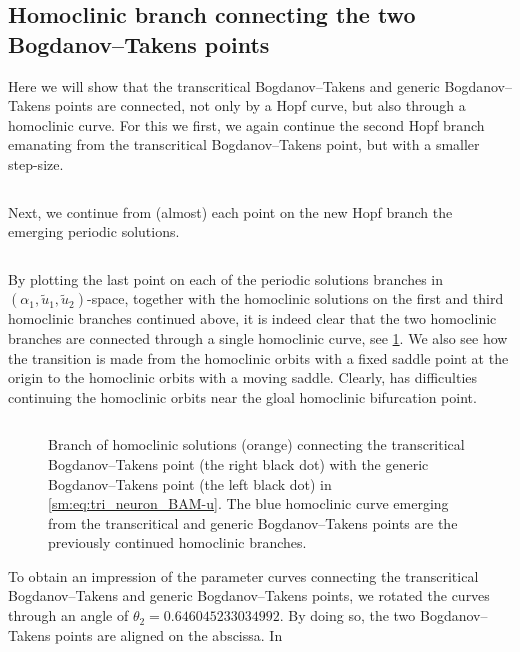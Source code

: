 \subsection{\ifthesis \phantom{ } \fi Homoclinic branch connecting the two Bogdanov--Takens \ifthesis \phantom{ } \fi points}
Here we will show that the transcritical Bogdanov--Takens and generic
Bogdanov--Takens points are connected, not only by a Hopf curve, but also
through a homoclinic curve. For this we first, we again continue the 
second Hopf branch emanating from the transcritical Bogdanov--Takens point,
but with a smaller step-size.
\inputminted[firstline=416, lastline=429]{MATLAB}{\pathToDDEBifToolDemos/BAM_neural_network_model/BAMnn.m}
%
Next, we continue from (almost) each point on the new Hopf branch the emerging periodic solutions.
\inputminted[firstline=436, lastline=446]{MATLAB}{\pathToDDEBifToolDemos/BAM_neural_network_model/BAMnn.m}
%
By plotting the last point on each of the periodic solutions branches in
$(\alpha_1, \tilde u_1, \tilde u_2)$-space,
together with the homoclinic solutions on the first and third homoclinic branches continued
above, it is indeed clear that the two homoclinic branches are connected through a
single homoclinic curve, see
\cref{sm:fig:triNeuronBAMNeuralNetworkModelConnectionHomoclinicSolutions}.
We also see how the transition is made from the homoclinic orbits with a fixed saddle point
at the origin to the homoclinic orbits with a moving saddle. Clearly, \DDEBIFTOOL has
difficulties continuing the homoclinic orbits near the gloal homoclinic bifurcation point.
\inputminted[firstline=461, lastline=490]{MATLAB}{\pathToDDEBifToolDemos/BAM_neural_network_model/BAMnn.m}
%
\begin{figure}[ht]
    \caption{
        Branch of homoclinic solutions (orange) connecting the transcritical Bogdanov--Takens point (the right black dot) with
        the generic Bogdanov--Takens point (the left black dot) in
        \cref{sm:eq:tri_neuron_BAM-u}. The blue homoclinic curve emerging from 
        the transcritical and generic Bogdanov--Takens points are the previously continued
        homoclinic branches.
     }
    \label{sm:fig:triNeuronBAMNeuralNetworkModelConnectionHomoclinicSolutions}
\end{figure}
To obtain an impression of the parameter curves connecting the transcritical Bogdanov--Takens and
generic Bogdanov--Takens points, we rotated the  curves through an angle of $\theta_2=0.646045233034992$.
By doing so, the two Bogdanov--Takens points are aligned on the abscissa. In
